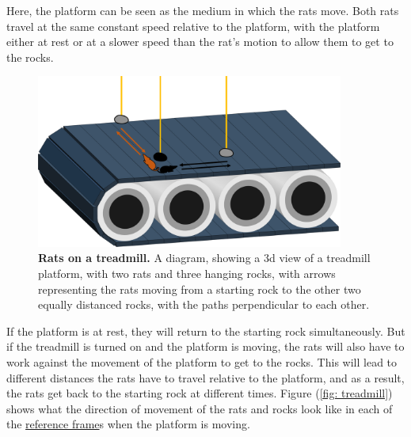 Here, the platform can be seen as the medium in which the rats move.
Both rats travel at the same constant speed relative to the platform, with the platform either at rest or at a slower speed than the rat's motion to allow them to get to the rocks.

\begin{figure}[H]
	\centering
	\includegraphics[width = 0.9\textwidth]{images/pdf/Conveyor_belt_3d.pdf}
	\caption{\textbf{Rats on a treadmill.} A diagram, showing a 3d view of a treadmill platform, with two rats and three hanging rocks, with arrows representing the rats moving from a starting rock to the other two equally distanced rocks, with the paths perpendicular to each other.}
	\label{fig: 3d conveyor belt}
\end{figure}

If the platform is at rest, they will return to the starting rock simultaneously.
But if the treadmill is turned on and the platform is moving, the rats will also have to work against the movement of the platform to get to the rocks.
This will lead to different distances the rats have to travel relative to the platform, and as a result, the rats get back to the starting rock at different times.
Figure (\ref{fig: treadmill}) shows what the direction of movement of the rats and rocks look like in each of the \hyperlink{def-Reference-frame}{reference frame}s when the platform is moving.

